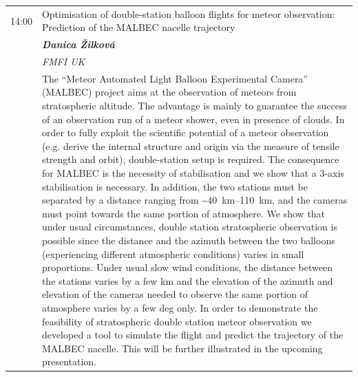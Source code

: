 \documentclass[a4paper]{report}
\begin{document}
\begin{tabularx}{\textwidth}{>{}p{2cm} >{\RaggedRight}X}
 \\
                                        \midrule                            {\Large 14:00} & {\Large Optimisation of double-station balloon flights for meteor observation: Prediction of the MALBEC nacelle trajectory} \\
                                            & \textit{\textbf{Danica Žilková}} \\
                                                                & \textit{FMFI UK} \\
                                                                & The “Meteor Automated Light Balloon Experimental Camera” (MALBEC) project aims at the observation of meteors from stratospheric altitude. The advantage is mainly to guarantee the success of an observation run of a meteor shower, even in presence of clouds. In order to fully exploit the scientific potential of a meteor observation (e.g. derive the internal structure and origin via the measure of tensile strength and orbit), double-station setup is required. The consequence for MALBEC is the necessity of stabilisation and we show that a 3-axis stabilisation is necessary. In addition, the two stations must be separated by a distance ranging from \textasciitilde\SIrange{40}{110}{\kilo\metre}, and the cameras must point towards the same portion of atmosphere. We show that under usual circumstances, double station stratospheric observation is possible since the distance and the azimuth between the two balloons (experiencing different atmospheric conditions) varies in small proportions. Under usual slow wind conditions, the distance between the stations varies by a few km and the elevation of the azimuth and elevation of the cameras needed to observe the same portion of atmosphere varies by a few deg only. In order to demonstrate the feasibility of stratospheric double station meteor observation we developed a tool to simulate the flight and predict the trajectory of the MALBEC nacelle. This will be further illustrated in the upcoming presentation.
 \\
                                                                \bottomrule
        \end{tabularx}
\end{document}

